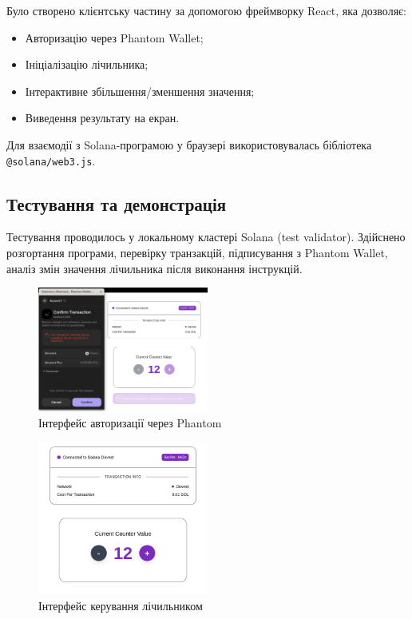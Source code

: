 \documentclass[14pt]{extreport}
\begin{document}
Було створено клієнтську частину за допомогою фреймворку React, яка дозволяє:
\begin{itemize}
    \item Авторизацію через Phantom Wallet;
    \item Ініціалізацію лічильника;
    \item Інтерактивне збільшення/зменшення значення;
    \item Виведення результату на екран.
\end{itemize}

Для взаємодії з Solana-програмою у браузері використовувалась бібліотека \texttt{@solana/web3.js}.

\subsection{Тестування та демонстрація}

Тестування проводилось у локальному кластері Solana (test validator). Здійснено розгортання програми, перевірку транзакцій, підписування з Phantom Wallet, аналіз змін значення лічильника після виконання інструкцій.

\begin{figure}[H]
    \centering
    \includegraphics[width=0.5\textwidth]{2}
    \caption{Інтерфейс авторизації через Phantom}
\end{figure}

\begin{figure}[H]
    \centering
    \includegraphics[width=0.5\textwidth]{1}
    \caption{Інтерфейс керування лічильником}
\end{figure}
\end{document}
